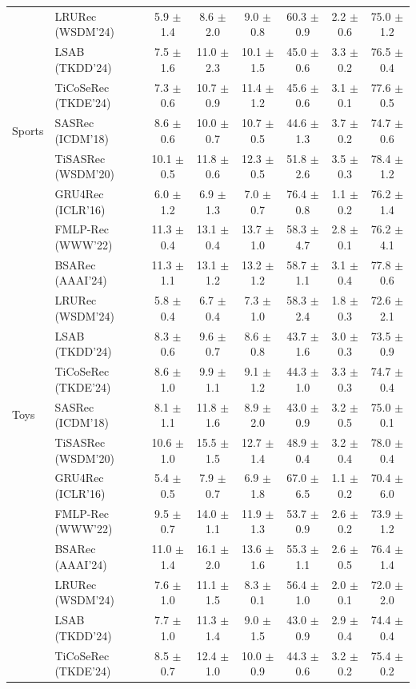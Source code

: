 \begin{table}[!htbp]
\begin{tabular}{llcccccc}
 & LRURec (WSDM'24) & 5.9 $\pm$ 1.4 & 8.6 $\pm$ 2.0 & 9.0 $\pm$ 0.8 & 60.3 $\pm$ 0.9 & 2.2 $\pm$ 0.6 & 75.0 $\pm$ 1.2 \\
 & LSAB (TKDD'24) & 7.5 $\pm$ 1.6 & 11.0 $\pm$ 2.3 & 10.1 $\pm$ 1.5 & 45.0 $\pm$ 0.6 & 3.3 $\pm$ 0.2 & 76.5 $\pm$ 0.4 \\
 & TiCoSeRec (TKDE'24) & 7.3 $\pm$ 0.6 & 10.7 $\pm$ 0.9 & 11.4 $\pm$ 1.2 & 45.6 $\pm$ 0.6 & 3.1 $\pm$ 0.1 & 77.6 $\pm$ 0.5 \\
\midrule
Sports & SASRec (ICDM'18) & 8.6 $\pm$ 0.6 & 10.0 $\pm$ 0.7 & 10.7 $\pm$ 0.5 & 44.6 $\pm$ 1.3 & 3.7 $\pm$ 0.2 & 74.7 $\pm$ 0.6 \\
 & TiSASRec (WSDM'20) & 10.1 $\pm$ 0.5 & 11.8 $\pm$ 0.6 & 12.3 $\pm$ 0.5 & 51.8 $\pm$ 2.6 & 3.5 $\pm$ 0.3 & 78.4 $\pm$ 1.2 \\
 & GRU4Rec (ICLR'16) & 6.0 $\pm$ 1.2 & 6.9 $\pm$ 1.3 & 7.0 $\pm$ 0.7 & 76.4 $\pm$ 0.8 & 1.1 $\pm$ 0.2 & 76.2 $\pm$ 1.4 \\
 & FMLP-Rec (WWW'22) & 11.3 $\pm$ 0.4 & 13.1 $\pm$ 0.4 & 13.7 $\pm$ 1.0 & 58.3 $\pm$ 4.7 & 2.8 $\pm$ 0.1 & 76.2 $\pm$ 4.1 \\
 & BSARec (AAAI'24) & 11.3 $\pm$ 1.1 & 13.1 $\pm$ 1.2 & 13.2 $\pm$ 1.2 & 58.7 $\pm$ 1.1 & 3.1 $\pm$ 0.4 & 77.8 $\pm$ 0.6 \\
 & LRURec (WSDM'24) & 5.8 $\pm$ 0.4 & 6.7 $\pm$ 0.4 & 7.3 $\pm$ 1.0 & 58.3 $\pm$ 2.4 & 1.8 $\pm$ 0.3 & 72.6 $\pm$ 2.1 \\
 & LSAB (TKDD'24) & 8.3 $\pm$ 0.6 & 9.6 $\pm$ 0.7 & 8.6 $\pm$ 0.8 & 43.7 $\pm$ 1.6 & 3.0 $\pm$ 0.3 & 73.5 $\pm$ 0.9 \\
 & TiCoSeRec (TKDE'24) & 8.6 $\pm$ 1.0 & 9.9 $\pm$ 1.1 & 9.1 $\pm$ 1.2 & 44.3 $\pm$ 1.0 & 3.3 $\pm$ 0.3 & 74.7 $\pm$ 0.4 \\
\midrule
Toys & SASRec (ICDM'18) & 8.1 $\pm$ 1.1 & 11.8 $\pm$ 1.6 & 8.9 $\pm$ 2.0 & 43.0 $\pm$ 0.9 & 3.2 $\pm$ 0.5 & 75.0 $\pm$ 0.1 \\
 & TiSASRec (WSDM'20) & 10.6 $\pm$ 1.0 & 15.5 $\pm$ 1.5 & 12.7 $\pm$ 1.4 & 48.9 $\pm$ 0.4 & 3.2 $\pm$ 0.4 & 78.0 $\pm$ 0.4 \\
 & GRU4Rec (ICLR'16) & 5.4 $\pm$ 0.5 & 7.9 $\pm$ 0.7 & 6.9 $\pm$ 1.8 & 67.0 $\pm$ 6.5 & 1.1 $\pm$ 0.2 & 70.4 $\pm$ 6.0 \\
 & FMLP-Rec (WWW'22) & 9.5 $\pm$ 0.7 & 14.0 $\pm$ 1.1 & 11.9 $\pm$ 1.3 & 53.7 $\pm$ 0.9 & 2.6 $\pm$ 0.2 & 73.9 $\pm$ 1.2 \\
 & BSARec (AAAI'24) & 11.0 $\pm$ 1.4 & 16.1 $\pm$ 2.0 & 13.6 $\pm$ 1.6 & 55.3 $\pm$ 1.1 & 2.6 $\pm$ 0.5 & 76.4 $\pm$ 1.4 \\
 & LRURec (WSDM'24) & 7.6 $\pm$ 1.0 & 11.1 $\pm$ 1.5 & 8.3 $\pm$ 0.1 & 56.4 $\pm$ 1.0 & 2.0 $\pm$ 0.1 & 72.0 $\pm$ 2.0 \\
 & LSAB (TKDD'24) & 7.7 $\pm$ 1.0 & 11.3 $\pm$ 1.4 & 9.0 $\pm$ 1.5 & 43.0 $\pm$ 0.9 & 2.9 $\pm$ 0.4 & 74.4 $\pm$ 0.4 \\
 & TiCoSeRec (TKDE'24) & 8.5 $\pm$ 0.7 & 12.4 $\pm$ 1.0 & 10.0 $\pm$ 0.9 & 44.3 $\pm$ 0.6 & 3.2 $\pm$ 0.2 & 75.4 $\pm$ 0.2 \\
\bottomrule
\end{tabular}
\end{table}
